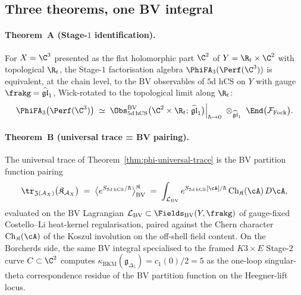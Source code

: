 \subsection*{Three theorems, one BV integral}

\paragraph{Theorem~A (Stage-$1$ identification).}
For $X = \C^3$ presented as the flat holomorphic part $\C^2$ of
$Y = \R_t\times\C^2$ with topological $\R_t$, the Stage-$1$
factorisation algebra $\PhiFA_3(\Perf(\C^3))$ is equivalent, at the
chain level, to the BV observables of $5$d hCS on $Y$ with gauge
$\frakg = \widehat{\mathfrak{gl}}_1$, Wick-rotated to the topological
limit along $\R_t$:
\begin{equation}
\label{eq:stage1-5d-hCS}
  \PhiFA_3\bigl(\Perf(\C^3)\bigr) \;\simeq\;
  \Obs^{\mathrm{BV}}_{5\mathrm{d\,hCS}}\bigl(\C^2\times\R_t;\, \widehat{\mathfrak{gl}}_1\bigr)\Big|_{\hbar\to 0}
  \;\otimes_{\widehat{\mathfrak{gl}}_1}\; \End\bigl(\mathcal{F}_{\mathrm{Fock}}\bigr).
\end{equation}

\paragraph{Theorem~B (universal trace = BV pairing).}
The universal trace of
Theorem~\ref{thm:phi-universal-trace} is the
BV partition function pairing
\begin{equation}
\label{eq:universal-trace-BV}
  \tr_{\mathfrak{Z}(\mathcal{A}_X)}\bigl(\mathfrak{K}_{\mathcal{A}_X}\bigr)
  \;=\;
  \bigl\langle e^{S_{5\mathrm{d\,hCS}}/\hbar}\bigr\rangle_{\mathrm{BV}}^{\mathfrak{K}}
  \;=\;
  \int_{\mathcal{L}_{\mathrm{BV}}} e^{S_{5\mathrm{d\,hCS}}[\cA]/\hbar}\,
  \mathrm{Ch}_{\mathfrak{K}}(\cA)\,D\cA,
\end{equation}
evaluated on the BV Lagrangian $\mathcal{L}_{\mathrm{BV}}\subset
\Fields_{\mathrm{BV}}(Y,\frakg)$ of gauge-fixed Costello--Li heat-kernel
regularisation, paired against the Chern character
$\mathrm{Ch}_{\mathfrak{K}}(\cA)$ of the Koszul involution on the
off-shell field content. On the Borcherds side, the same BV integral
specialised to the framed $K3\times E$ Stage-$2$ curve $C\subset \C^2$
computes $\kappa_{\mathrm{BKM}}(\mathfrak{g}_{\Delta_5}) = c_1(0)/2 = 5$
as the one-loop singular-theta correspondence residue of the BV
partition function on the Heegner-lift locus.

